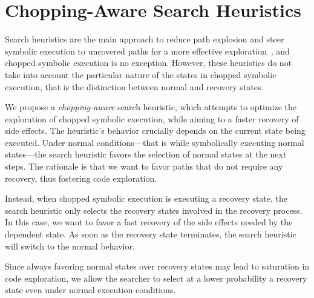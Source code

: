 
\section{Chopping-Aware Search Heuristics}
\label{Se:Search}

Search heuristics are the main approach to reduce path explosion and
steer symbolic execution to uncovered paths for a more effective
exploration~\cite{exe,klee,sen:concolicheuristics,fitsymex:dsn09}, and
chopped symbolic execution is no exception. However, these heuristics
do not take into account the particular nature of the states in
chopped symbolic execution, that is the distinction between normal and
recovery states.

We propose a \textit{chopping-aware} search heuristic, which attempts
to optimize the exploration of chopped symbolic execution, while
aiming to a faster recovery of side effects. The heuristic's behavior
crucially depends on the current state being executed. Under normal
conditions---that is while symbolically executing normal states---the
search heuristic favors the selection of normal states at the next
steps. The rationale is that we want to favor paths that do not
require any recovery, thus fostering code exploration.

Instead, when chopped symbolic execution is executing a recovery
state, the search heuristic only selects the recovery states involved
in the recovery process. In this case, we want to favor a fast
recovery of the side effects needed by the dependent state. As soon as
the recovery state terminates, the search heuristic will switch to the
normal behavior.

Since always favoring normal states over recovery states may lead to
saturation in code exploration, we allow the searcher to select at a
lower probability a recovery state even under normal execution
conditions.

